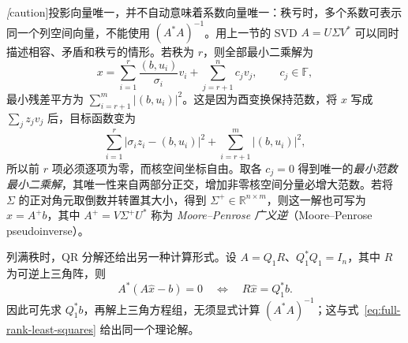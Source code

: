 \emph[caution]{投影向量唯一，并不自动意味着系数向量唯一}：秩亏时，多个系数可表示同一个列空间向量，不能使用 $(A^*A)^{-1}$。用上一节的 SVD $A=U\Sigma V^*$ 可以同时描述相容、矛盾和秩亏的情形。若秩为 $r$，则全部最小二乘解为
\begin{equation}
\label{eq:svd-least-squares}
    x=\sum_{i=1}^r\frac{(b,u_i)}{\sigma_i}v_i
      +\sum_{j=r+1}^n c_jv_j,\qquad c_j\in\mathbb F,
\end{equation}
最小残差平方为 $\sum_{i=r+1}^m|(b,u_i)|^2$。这是因为酉变换保持范数，将 $x$ 写成 $\sum_jz_jv_j$ 后，目标函数变为
\[
    \sum_{i=1}^r|\sigma_i z_i-(b,u_i)|^2
    +\sum_{i=r+1}^m|(b,u_i)|^2,
\]
所以前 $r$ 项必须逐项为零，而核空间坐标自由。取各 $c_j=0$ 得到唯一的\emph{最小范数最小二乘解}，其唯一性来自两部分正交，增加非零核空间分量必增大范数。若将 $\Sigma$ 的正对角元取倒数并转置其大小，得到 $\Sigma^+\in\mathbb R^{n\times m}$，则这一解也可写为 $x=A^+b$，其中 $A^+=V\Sigma^+U^*$ 称为 \emph{Moore--Penrose 广义逆}（Moore--Penrose pseudoinverse）。

列满秩时，QR 分解还给出另一种计算形式。设 $A=Q_1R$、$Q_1^*Q_1=I_n$，其中 $R$ 为可逆上三角阵，则
\[
    A^*(A\widehat x-b)=0
    \quad\Longleftrightarrow\quad R\widehat x=Q_1^*b.
\]
因此可先求 $Q_1^*b$，再解上三角方程组，无须显式计算 $(A^*A)^{-1}$；这与式~\eqref{eq:full-rank-least-squares} 给出同一个理论解。

